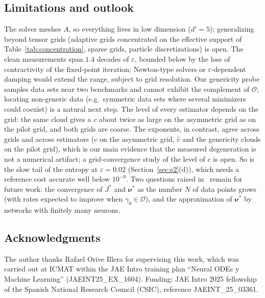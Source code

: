 \documentclass[11pt,leqno]{amsart}
\newcommand{\cO}{\mathcal{O}}
\newcommand{\bnu}{\boldsymbol{\nu}}
\newcommand{\eps}{\varepsilon}
\numberwithin{equation}{section}
\theoremstyle{definition}
\begin{document}
\subsection{Limitations and outlook}
The solver meshes $A$, so everything lives in low dimension ($d'=5$);
generalizing beyond tensor grids (adaptive grids concentrated on the
effective support of Table~\ref{tab:concentration}, sparse grids, particle
discretizations) is open.  The clean measurements span $1.4$ decades of
$\eps$, bounded below by the loss of contractivity of the fixed-point
iteration; Newton-type solvers or $\eps$-dependent damping would extend the
range, subject to grid resolution.  Our genericity probe samples data sets
near two benchmarks and cannot exhibit the complement of $\cO$; locating
non-generic data (e.g.\ symmetric data sets where several minimizers could
coexist) is a natural next step.  The level of every estimator depends on
the grid: the same cloud gives a $c$ about twice as large on the asymmetric
grid as on the pilot grid, and both grids are coarse.  The exponents, in
contrast, agree across grids and across estimators ($c$ on the asymmetric
grid, $\hat c$ and the genericity clouds on the pilot grid), which is our
main evidence that the measured degeneration is not a numerical artifact;
a grid-convergence study of the level of $c$ is open.  So is the slow tail
of the entropy at $\eps=0.02$ (Section~\ref{sec:e2}(d)), which needs a
reference cost accurate well below $10^{-9}$.  Two questions
raised in~\cite{DaudinDelarue2025} remain for future work: the convergence
of $J^*$ and $\bnu^*$ as the number $N$ of data points grows (with rates
expected to improve when $\gamma_0\in\cO$), and the approximation of
$\bnu^*$ by networks with finitely many neurons.

\subsection*{Acknowledgments}
The author thanks Rafael Orive Illera for supervising this work, which
was carried out at ICMAT within the JAE Intro training plan ``Neural ODEs y
Machine Learning'' (JAEINT25\_EX\_1604).  Funding: JAE Intro 2025
fellowship of the Spanish National Research Council (CSIC), reference
JAEINT\_25\_03361.

\appendix
\end{document}
